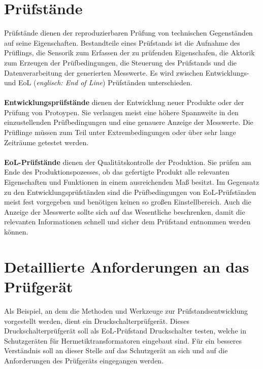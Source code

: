 \section{Prüfstände}
Prüfstände dienen der reproduzierbaren Prüfung von technischen Gegenständen auf seine Eigenschaften.
Bestandteile eines Prüfstands ist die Aufnahme des Prüflings, die Sensorik zum Erfassen der zu prüfenden Eigenschafen,
die Aktorik zum Erzeugen der Prüfbedingungen, die Steuerung des Prüfstands
und die Datenverarbeitung der generierten Messwerte. Es wird zwischen Entwicklungs- und EoL
(\textit{englisch: End of Line}) Prüfständen unterschieden.
\\
\\
\textbf{Entwicklungsprüfstände} dienen der Entwicklung neuer Produkte oder der Prüfung von Protoypen.
Sie verlangen meist eine höhere Spannweite in den einzustellenden Prüfbedingungen und eine genauere
Anzeige der Messwerte. Die Prüflinge müssen zum Teil unter Extrembedingungen oder über sehr lange Zeiträume
getestet werden.
\\
\\
\textbf{EoL-Prüfstände} dienen der Qualitätskontrolle der Produktion. Sie prüfen am Ende des Produktionspozesses,
ob das gefertigte Produkt alle relevanten Eigenschaften und Funktionen in einem ausreichenden Maß besitzt.
Im Gegensatz zu den Entwicklungsprüfständen sind die Prüfbedingungen von EoL-Prüfständen meist fest vorgegeben
und benötigen keinen so großen Einstellbereich. Auch die Anzeige der Messwerte sollte sich auf das Wesentliche
beschrenken, damit die relevanten Informationen schnell und sicher dem Prüfstand entnommen werden können.

\section{Detaillierte Anforderungen an das Prüfgerät}
Als Beispiel, an dem die Methoden und Werkzeuge zur Prüfstandsentwicklung vorgestellt werden,
dient ein Druckschalterprüfgerät. Dieses Druckschalterprüfgerät soll als EoL-Prüfstand Druckschalter
testen, welche in Schutzgeräten für Hermetiktransformatoren eingebaut sind. Für ein besseres Verständnis
soll an dieser Stelle auf das Schutzgerät an sich und auf die Anforderungen des Prüfgeräts eingegangen werden.

